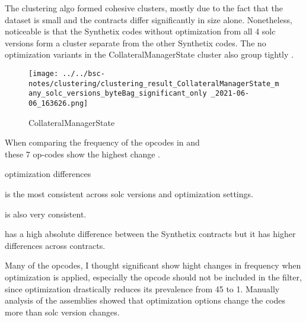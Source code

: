 \documentclass[../main.tex]{subfiles}
\begin{document}
The clustering algo formed cohesive clusters, mostly due to the fact that the dataset is small and the contracts differ significantly in size alone.
Nonetheless, noticeable is that the Synthetix codes without optimization from all 4 solc versions form a cluster separate from the other Synthetix codes. The no optimization variants in the CollateralManagerState cluster also group tightly .

\begin{figure*}[ht!]
  \centering
  \texttt{[image: ../../bsc-notes/clustering/clustering\_result\_CollateralManagerState\_many\_solc\_versions\_byteBag\_significant\_only \_2021-06-06\_163626.png]}
  \caption{CollateralManagerState}
  \label{fig:CollateralManagerState}
\end{figure*}

When comparing the frequency of the opcodes in  and\\
 these 7 op-codes show the highest change .

\begin{table}[ht!]
  \centering
  \caption{optimization differences}
  \label{tbl:opt_diff}
\end{table}

 is the most consistent across solc versions and optimization settings.

 is also very consistent.

 has a high absolute difference between the Synthetix contracts but it has higher differences across contracts.

Many of the opcodes, I thought significant show hight changes in frequency when optimization is applied, especially the  opcode should not be included in the filter, since optimization drastically reduces its prevalence from 45 to 1.
Manually analysis of the assemblies showed that optimization options change the codes more than solc version changes.
\end{document}
